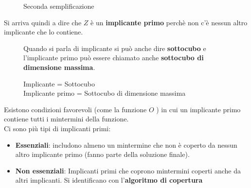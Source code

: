 \documentclass[a4paper]{article}
\theoremstyle{break}
\theoremstyle{break}
\theoremstyle{break}
\theoremstyle{break}
\begin{document}
\begin{figure}[H]
    \begin{center}
    \end{center}
    \caption{Seconda semplificazione} 
\end{figure}
Si arriva quindi a dire che \( Z \) è un \textbf{implicante primo} perchè non c'è nessun
altro implicante che lo contiene.
\begin{figure}[H]
	\begin{define}
		Quando si parla di implicante si può anche dire \textbf{sottocubo} e
		l'implicante primo può essere chiamato anche \textbf{sottocubo di dimensione
			massima}.
		\begin{center}
			Implicante = Sottocubo\\
			Implicante primo = Sottocubo di dimensione massima
		\end{center}
	\end{define}
\end{figure}
Esistono condizioni favorevoli (come la funzione \( O \) ) in cui un implicante primo
contiene tutti i mintermini della funzione.\\
Ci sono più tipi di implicanti primi:
\begin{itemize}
	\item \textbf{Essenziali}: includono almeno un mintermine che non è coperto da nessun
	      altro implicante primo (fanno parte della soluzione finale).
	\item \textbf{Non essenziali}:  Implicanti primi che coprono mintermini
	      coperti anche da altri implicanti.
	      Si identificano con l'\textbf{algoritmo di copertura}
\end{itemize}
\end{document}
